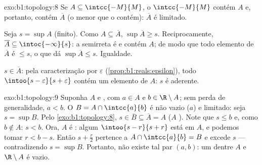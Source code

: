 \begin{solution}{exo:b1:topology:8}
Se $A \subseteq \intcc{-M}{M}$, o  $\intcc{-M}{M}$
contém $A$ e, portanto, contém $\overline A$ (o menor  que
o contém): $\overline A$ é limitado.

Seja $s = \sup A$ (finito). Como $A \subseteq \overline A$, $\sup
\overline A \geq s$. Reciprocamente, $\overline A \subseteq
\intoc{-\infty}{s}$: a semirreta é  e contém $A$; de modo que
todo elemento de $\overline A$ é $\leq s$, o que dá $\sup\overline A
\leq s$. Igualdade.

$s \in \overline A$: pela caracterização por $\varepsilon$
(\cref{prop:b1:reals:epsilon}), todo  $\intoo{s -
\varepsilon}{s + \varepsilon}$ contém um elemento de $A$: $s$ é
aderente.
\end{solution}

\begin{solution}{exo:b1:topology:9}
Suponha $A$  e , com $a \in A$ e $b \in \R
\setminus A$; sem perda de generalidade, $a < b$. O  $B = A \cap
\intcc{a}{b}$ é não vazio ($a$) e limitado: seja $s = \sup B$. Pelo
\cref{exo:b1:topology:8}, $s \in \overline B \subseteq \overline A =
A$ ($A$ ). Note que $s \leq b$ e, como $b \notin A$: $s < b$.
Ora, $A$ é : algum  $\intoo{s - r}{s + r}$ está em $A$,
e podemos tomar $r < b - s$. Então $s + \frac{r}{2}$ pertence a $A
\cap \intcc{a}{b} = B$ e excede $s$ --- contradizendo $s = \sup
B$. Portanto, não existe tal par $(a, b)$: um dentre $A$ e $\R \setminus A$ é vazio.
\end{solution}


